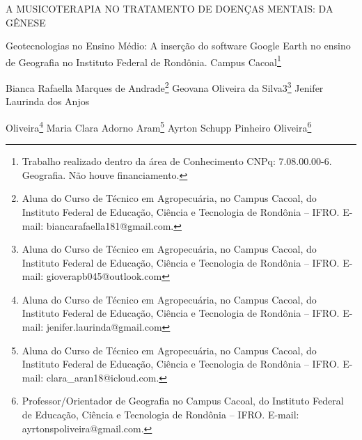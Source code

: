 \documentclass[article,12pt,onesidea,4paper,english,brazil]{abntex2}
\begin{document}
	
	
	\frenchspacing 
	
	\begin{center}
		\LARGE A MUSICOTERAPIA NO TRATAMENTO DE DOENÇAS MENTAIS: DA GÊNESE
		
	Geotecnologias no Ensino Médio: A inserção do software Google Earth no
	ensino de Geografia no Instituto Federal de Rondônia. Campus Cacoal\footnote{Trabalho realizado dentro da área de Conhecimento CNPq: 7.08.00.00-6. Geografia. Não houve
		financiamento.}
		
		\normalsize
	Bianca Rafaella Marques de Andrade\footnote{Aluna do Curso de Técnico em Agropecuária, no Campus Cacoal, do Instituto Federal de Educação,
		Ciência e Tecnologia de Rondônia – IFRO. E-mail: biancarafaella181@gmail.com.} 
	Geovana Oliveira da Silva3\footnote{
		Aluna do Curso de Técnico em Agropecuária, no Campus Cacoal, do Instituto Federal de Educação,
		Ciência e Tecnologia de Rondônia – IFRO. E-mail: gioverapb045@outlook.com}
	Jenifer Laurinda dos Anjos
	
	Oliveira\footnote{Aluna do Curso de Técnico em Agropecuária, no Campus Cacoal, do Instituto Federal de Educação,
		Ciência e Tecnologia de Rondônia – IFRO. E-mail: jenifer.laurinda@gmail.com} 
	Maria Clara Adorno Aram\footnote{Aluna do Curso de Técnico em Agropecuária, no Campus Cacoal, do Instituto Federal de Educação,
		Ciência e Tecnologia de Rondônia – IFRO. E-mail: clara\_aran18@icloud.com.} 
	Ayrton Schupp Pinheiro Oliveira\footnote{Professor/Orientador de Geografia no Campus Cacoal, do Instituto Federal de Educação, Ciência e
		Tecnologia de Rondônia – IFRO. E-mail: ayrtonspoliveira@gmail.com.} 
	 
	\end{center}
	
\end{document}
